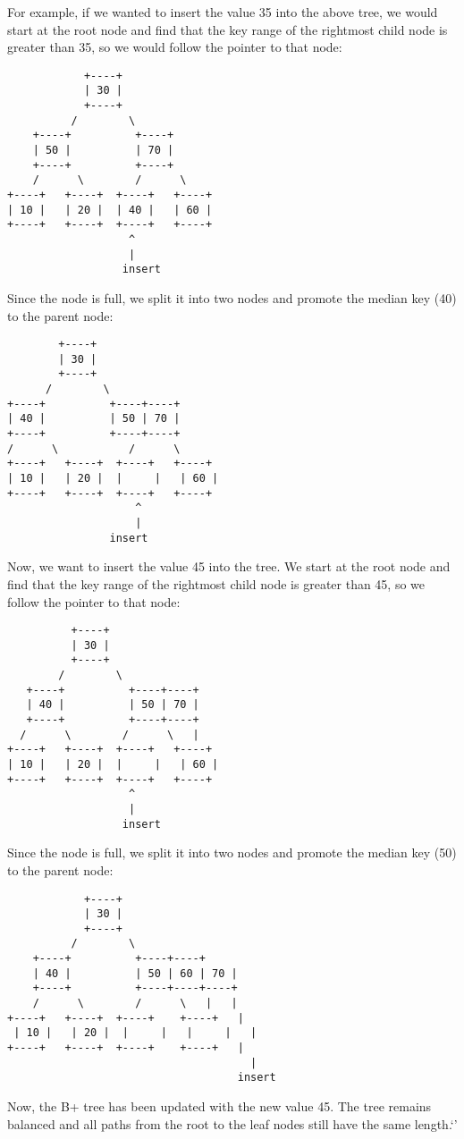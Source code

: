 \documentclass{article}
\begin{document}
For example, if we wanted to insert the value 35 into the above tree, we would start at the root node and find that the key range of the rightmost child node is greater than 35, so we would follow the pointer to that node:
\begin{lstlisting}
            +----+
            | 30 |
            +----+
          /        \
    +----+          +----+
    | 50 |          | 70 |
    +----+          +----+
    /      \        /      \
+----+   +----+  +----+   +----+
| 10 |   | 20 |  | 40 |   | 60 |
+----+   +----+  +----+   +----+
                   ^
                   |
                  insert

\end{lstlisting}
Since the node is full, we split it into two nodes and promote the median key (40) to the parent node:
\begin{lstlisting}
        +----+
        | 30 |
        +----+
      /        \
+----+          +----+----+
| 40 |          | 50 | 70 |
+----+          +----+----+
/      \           /      \   
+----+   +----+  +----+   +----+
| 10 |   | 20 |  |     |   | 60 |
+----+   +----+  +----+   +----+
                    ^
                    |
                insert

\end{lstlisting}
Now, we want to insert the value 45 into the tree. We start at the root node and find that the key range of the rightmost child node is greater than 45, so we follow the pointer to that node:
\begin{lstlisting}
          +----+
          | 30 |
          +----+
        /        \
   +----+          +----+----+
   | 40 |          | 50 | 70 |
   +----+          +----+----+
  /      \        /      \   |
+----+   +----+  +----+   +----+
| 10 |   | 20 |  |     |   | 60 |
+----+   +----+  +----+   +----+
                   ^
                   |
                  insert

\end{lstlisting}
Since the node is full, we split it into two nodes and promote the median key (50) to the parent node:
\begin{lstlisting}
            +----+
            | 30 |
            +----+
          /        \
    +----+          +----+----+
    | 40 |          | 50 | 60 | 70 |
    +----+          +----+----+----+
    /      \        /      \   |   |
+----+   +----+  +----+    +----+   |
 | 10 |   | 20 |  |     |   |     |   |
+----+   +----+  +----+    +----+   |
                                      |
                                    insert

\end{lstlisting}
Now, the B+ tree has been updated with the new value 45. The tree remains balanced and all paths from the root to the leaf nodes still have the same length.`'
\end{document}

